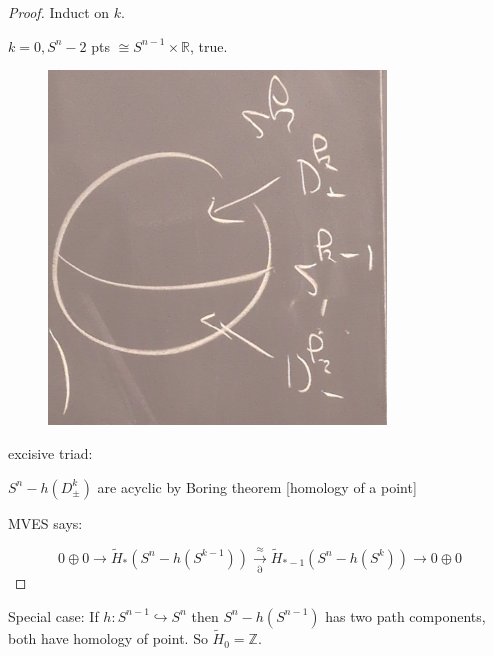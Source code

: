 \documentclass{article}
\theoremstyle{definition}
\begin{document}
    \begin{proof}
        Induct on \(k\).

        \(k = 0, S^n - 2\) pts \(\cong S^{n-1} \times \mathbb{R}\), true.

        \begin{figure}[H]
            \centering
            \includegraphics[width=0.8\textwidth]{img/duality}
            \caption{}
            \label{fig:}
        \end{figure}

        excisive triad:

        \begin{center}
        \end{center}

        \(S^n - h(D^k_{\pm})\) are acyclic by Boring theorem [homology of a point]

        MVES says:

        \[
            0 \oplus 0 \to \widetilde{H}_{\ast} (S^n - h(S^{k-1})) \xrightarrow[\partial]{\approx} \widetilde{H}_{\ast-1} (S^n - h(S^k)) \to 0\oplus 0 
        \]
    \end{proof}

    Special case: If \(h:S^{n-1} \hookrightarrow S^n\) then \(S^n - h(S^{n-1})\) has two path components, both have homology of point. So \(\widetilde{H}_0 = \mathbb{Z}\).
\end{document}
